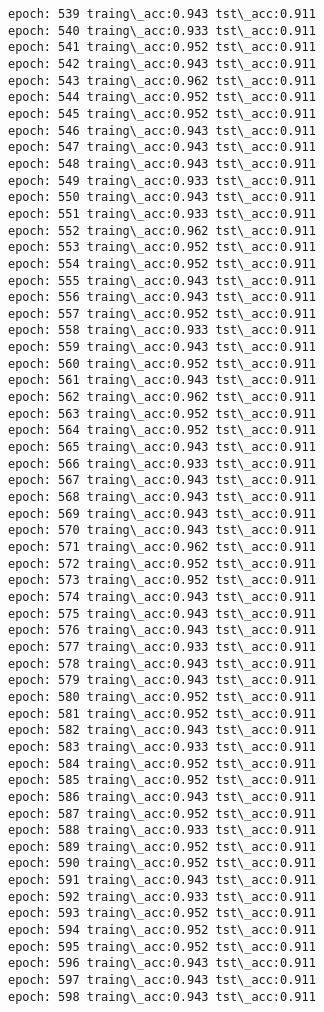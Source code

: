 \documentclass[11pt]{article}
\begin{document}
\begin{Verbatim}[commandchars=\\\{\}]
epoch: 539 traing\_acc:0.943 tst\_acc:0.911
epoch: 540 traing\_acc:0.933 tst\_acc:0.911
epoch: 541 traing\_acc:0.952 tst\_acc:0.911
epoch: 542 traing\_acc:0.943 tst\_acc:0.911
epoch: 543 traing\_acc:0.962 tst\_acc:0.911
epoch: 544 traing\_acc:0.952 tst\_acc:0.911
epoch: 545 traing\_acc:0.952 tst\_acc:0.911
epoch: 546 traing\_acc:0.943 tst\_acc:0.911
epoch: 547 traing\_acc:0.943 tst\_acc:0.911
epoch: 548 traing\_acc:0.943 tst\_acc:0.911
epoch: 549 traing\_acc:0.933 tst\_acc:0.911
epoch: 550 traing\_acc:0.943 tst\_acc:0.911
epoch: 551 traing\_acc:0.933 tst\_acc:0.911
epoch: 552 traing\_acc:0.962 tst\_acc:0.911
epoch: 553 traing\_acc:0.952 tst\_acc:0.911
epoch: 554 traing\_acc:0.952 tst\_acc:0.911
epoch: 555 traing\_acc:0.943 tst\_acc:0.911
epoch: 556 traing\_acc:0.943 tst\_acc:0.911
epoch: 557 traing\_acc:0.952 tst\_acc:0.911
epoch: 558 traing\_acc:0.933 tst\_acc:0.911
epoch: 559 traing\_acc:0.943 tst\_acc:0.911
epoch: 560 traing\_acc:0.952 tst\_acc:0.911
epoch: 561 traing\_acc:0.943 tst\_acc:0.911
epoch: 562 traing\_acc:0.962 tst\_acc:0.911
epoch: 563 traing\_acc:0.952 tst\_acc:0.911
epoch: 564 traing\_acc:0.952 tst\_acc:0.911
epoch: 565 traing\_acc:0.943 tst\_acc:0.911
epoch: 566 traing\_acc:0.933 tst\_acc:0.911
epoch: 567 traing\_acc:0.943 tst\_acc:0.911
epoch: 568 traing\_acc:0.943 tst\_acc:0.911
epoch: 569 traing\_acc:0.943 tst\_acc:0.911
epoch: 570 traing\_acc:0.943 tst\_acc:0.911
epoch: 571 traing\_acc:0.962 tst\_acc:0.911
epoch: 572 traing\_acc:0.952 tst\_acc:0.911
epoch: 573 traing\_acc:0.952 tst\_acc:0.911
epoch: 574 traing\_acc:0.943 tst\_acc:0.911
epoch: 575 traing\_acc:0.943 tst\_acc:0.911
epoch: 576 traing\_acc:0.943 tst\_acc:0.911
epoch: 577 traing\_acc:0.933 tst\_acc:0.911
epoch: 578 traing\_acc:0.943 tst\_acc:0.911
epoch: 579 traing\_acc:0.943 tst\_acc:0.911
epoch: 580 traing\_acc:0.952 tst\_acc:0.911
epoch: 581 traing\_acc:0.952 tst\_acc:0.911
epoch: 582 traing\_acc:0.943 tst\_acc:0.911
epoch: 583 traing\_acc:0.933 tst\_acc:0.911
epoch: 584 traing\_acc:0.952 tst\_acc:0.911
epoch: 585 traing\_acc:0.952 tst\_acc:0.911
epoch: 586 traing\_acc:0.943 tst\_acc:0.911
epoch: 587 traing\_acc:0.952 tst\_acc:0.911
epoch: 588 traing\_acc:0.933 tst\_acc:0.911
epoch: 589 traing\_acc:0.952 tst\_acc:0.911
epoch: 590 traing\_acc:0.952 tst\_acc:0.911
epoch: 591 traing\_acc:0.943 tst\_acc:0.911
epoch: 592 traing\_acc:0.933 tst\_acc:0.911
epoch: 593 traing\_acc:0.952 tst\_acc:0.911
epoch: 594 traing\_acc:0.952 tst\_acc:0.911
epoch: 595 traing\_acc:0.952 tst\_acc:0.911
epoch: 596 traing\_acc:0.943 tst\_acc:0.911
epoch: 597 traing\_acc:0.943 tst\_acc:0.911
epoch: 598 traing\_acc:0.943 tst\_acc:0.911

\end{Verbatim}
\end{document}
